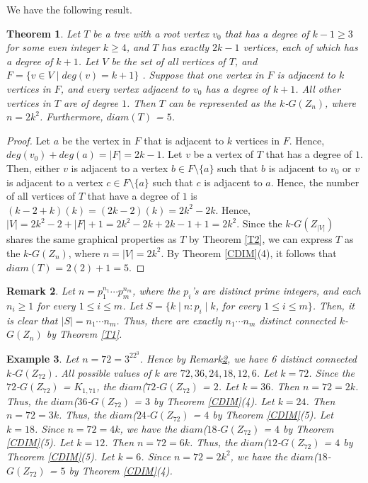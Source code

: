\documentclass{amsart}
\newtheorem{thm}{Theorem}[section]
\theoremstyle{plain}
\newtheorem{remk}[thm]{Remark}
\newtheorem{exa}[thm]{Example}
\begin{document}
We have the following result.
\begin{thm}\label{Tree2}
	Let $T$ be a tree with a root vertex $v_0$ that has a degree of $k-1 \geq 3$ for some even integer $k\geq 4$, and $T$ has exactly $2k - 1$ vertices, each of which has a degree of $k + 1$.  Let $V$ be the set of all vertices of $T$, and $F = \{v \in V \mid deg(v) = k+1\}$ . Suppose that one vertex in $F$ is adjacent to $k$ vertices in $F$, and every vertex adjacent to $v_0$ has a degree of $k+1$.  All other vertices in $T$ are of degree $1$. Then $T$ can be represented as the $k$-$G(Z_n)$, where $n = 2k^2$. Furthermore, $diam(T)$ = $5$.
\end{thm}
\begin{proof}
	 Let $a$ be the vertex in $F$ that is adjacent to $k$ vertices in $F$. Hence, $deg(v_0) + deg(a) = |F| = 2k - 1$. Let $v$ be a vertex of $T$ that has a degree of $1$. Then, either $v$ is adjacent to a vertex $b \in F\setminus \{a\}$ such that $b$ is adjacent to $v_0$ or $v$ is adjacent to a vertex $c \in F\setminus \{a\}$ such that $c$ is adjacent to $a$. Hence, the number of all vertices of $T$ that have a degree of $1$ is $(k-2 + k)(k) = (2k - 2)(k) = 2k^2 - 2k$. Hence, $|V| = 2k^2 - 2 + |F| + 1 = 2k^2 - 2k + 2k -1 + 1 = 2k^2$. Since the $k$-$G(Z_{|V|})$ shares the same graphical properties as $T$ by Theorem \ref{T2}, we can express  $T$ as the $k$-$G(Z_n)$, where $n = |V| =2k^2$. By Theorem \ref{CDIM}(4), it follows that $diam(T)$ = $2(2) + 1 = 5$.
	
\end{proof}
\begin{remk}\label{rng}
Let $n = p_1^{n_1}\cdots p_m^{n_m}$, where the $p_i$'s are distinct prime integers, and each $n_i \geq 1$ for every $1\leq i \leq m$. Let $S = \{k \mid n : p_i \mid k$, for every $1\leq i \leq m\}$. Then, it is clear that $|S| = n_1\cdots n_m$. Thus, there are exactly $n_1\cdots n_m$ distinct connected $k$-$G(Z_n)$ by Theorem \ref{T1}.
	\end{remk}
\begin{exa}
	Let $n = 72 = 3^22^3$. Hence by Remark\ref{rng}, we have 6 distinct connected $k$-$G(Z_{72})$. All possible values of $k$ are $72, 36, 24, 18, 12, 6$. Let $k = 72$. Since the $72$-$G(Z_{72})$ = $K_{1, 71}$, the $diam$($72$-$G(Z_{72})$ = $2$. Let $k = 36$. Then $n = 72 = 2k$. Thus, the $diam$($36$-$G(Z_{72})$ = $3$ by Theorem \ref {CDIM}(4). Let $k = 24$. Then $n = 72 = 3k$. Thus, the $diam$($24$-$G(Z_{72})$ = $4$ by Theorem \ref {CDIM}(5). Let $k = 18 $. Since $n = 72 = 4k$, we have the $diam$($18$-$G(Z_{72})$ = $4$ by Theorem \ref {CDIM}(5). Let $k = 12$. Then $n = 72 = 6k$. Thus, the $diam$($12$-$G(Z_{72})$ = $4$ by Theorem \ref {CDIM}(5). Let $k = 6$. Since $n = 72 = 2k^2$, we have the $diam$($18$-$G(Z_{72})$ = $5$ by Theorem \ref {CDIM}(4).

\end{exa}
\end{document}
